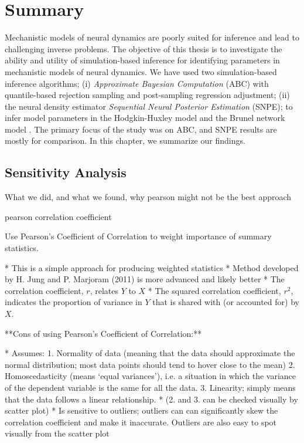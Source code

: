 \chapter{Summary}\label{chap:summary}

Mechanistic models of neural dynamics are poorly suited for inference and lead to challenging inverse problems. The objective of this thesis is to investigate the ability and utility of simulation-based inference for identifying parameters in mechanistic models of neural dynamics. We have used two simulation-based inference algorithms; (i) \textit{Approximate Bayesian Computation} (ABC) with quantile-based rejection sampling and post-sampling regression adjustment; (ii) the neural density estimator \textit{Sequential Neural Posterior Estimation} (SNPE); to infer model parameters in the Hodgkin-Huxley model \cite{HH1952} and the Brunel network model \cite{Brunel2000}. The primary focus of the study was on ABC, and SNPE results are mostly for comparison. In this chapter, we summarize our findings. 

\section{Sensitivity Analysis}

What we did, and what we found, why pearson might not be the best approach

pearson correlation coefficient

Use Pearson's Coefficient of Correlation to weight importance of summary statistics.

* This is a simple approach for producing weighted statistics 
    * Method developed by H. Jung and P. Marjoram (2011) is more advanced and likely better
* The correlation coefficient, $r$, relates $Y$ to $X$ 
* The squared correlation coefficient, $r^2$, indicates the proportion of variance in $Y$ that is shared with (or accounted for) by $X$.

**Cons of using Pearson's Coefficient of Correlation:**

* Assumes:
    1. Normality of data (meaning that the data should approximate the normal distribution; most data points should tend to hover close to the mean)
    2. Homoscedasticity (means ‘equal variances’), i.e. a situation in which the variance of the dependent variable is the same for all the data.
    3. Linearity; simply means that the data follows a linear relationship. 
* (2. and 3. can be checked visually by scatter plot)
* Is sensitive to outliers; outliers can can significantly skew the correlation coefficient and make it inaccurate. Outliers are also easy to spot visually from the scatter plot

